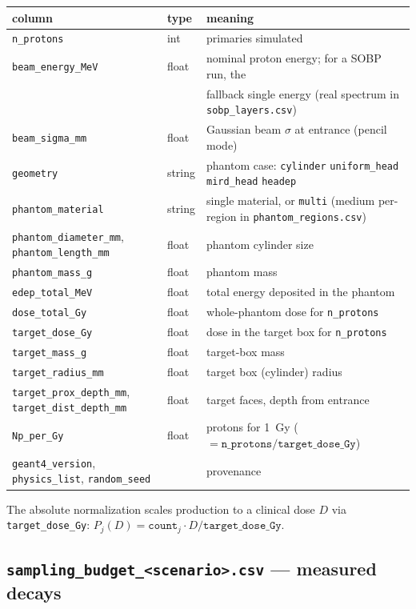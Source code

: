 \documentclass[11pt]{article}
\newcommand{\file}[1]{\texttt{#1}}
\begin{document}
\begin{center}
\begin{tabular}{@{}lll@{}}
\toprule
column & type & meaning \\
\midrule
\file{n\_protons} & int & primaries simulated \\
\file{beam\_energy\_MeV} & float & nominal proton energy; for a SOBP run, the \\
 & & fallback single energy (real spectrum in \file{sobp\_layers.csv}) \\
\file{beam\_sigma\_mm} & float & Gaussian beam $\sigma$ at entrance (pencil mode) \\
\file{geometry} & string & phantom case: \file{cylinder} \textbar{} \file{uniform\_head} \textbar{} \file{mird\_head} \textbar{} \file{headep} \\
\file{phantom\_material} & string & single material, or \file{multi} (medium per-region in \file{phantom\_regions.csv}) \\
\file{phantom\_diameter\_mm}, \file{phantom\_length\_mm} & float & phantom cylinder size \\
\file{phantom\_mass\_g} & float & phantom mass \\
\file{edep\_total\_MeV} & float & total energy deposited in the phantom \\
\file{dose\_total\_Gy} & float & whole-phantom dose for \file{n\_protons} \\
\file{target\_dose\_Gy} & float & dose in the target box for \file{n\_protons} \\
\file{target\_mass\_g} & float & target-box mass \\
\file{target\_radius\_mm} & float & target box (cylinder) radius \\
\file{target\_prox\_depth\_mm}, \file{target\_dist\_depth\_mm} & float & target faces, depth from entrance \\
\file{Np\_per\_Gy} & float & protons for \SI{1}{Gy} ($=\file{n\_protons}/\file{target\_dose\_Gy}$) \\
\file{geant4\_version}, \file{physics\_list}, \file{random\_seed} & & provenance \\
\bottomrule
\end{tabular}
\end{center}

The absolute normalization scales production to a clinical dose $D$ via
\file{target\_dose\_Gy}: $P_j(D)=\file{count}_j\cdot D/\file{target\_dose\_Gy}$.

\subsection{\file{sampling\_budget\_<scenario>.csv} --- measured decays}
\end{document}
